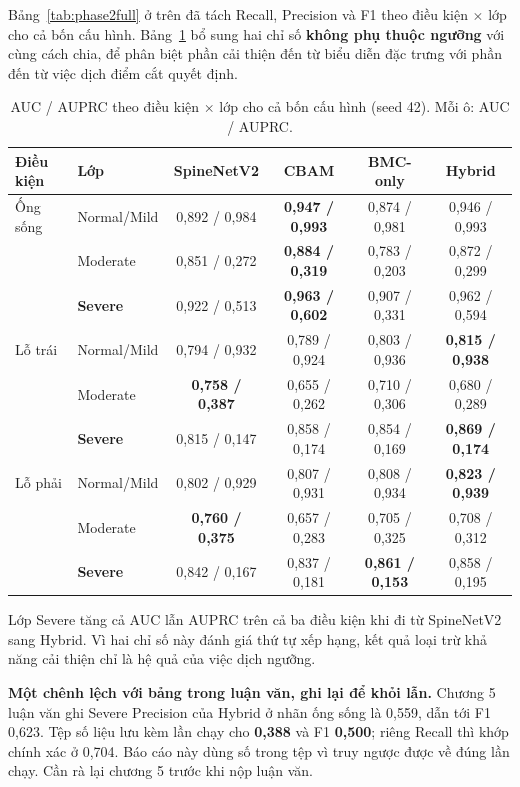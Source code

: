 \documentclass[11pt,a4paper]{article}
\begin{document}
Bảng~\ref{tab:phase2full} ở trên đã tách Recall, Precision và F1 theo điều kiện $\times$ lớp cho cả
bốn cấu hình. Bảng~\ref{tab:phase2auc} bổ sung hai chỉ số \textbf{không phụ thuộc ngưỡng} với cùng
cách chia, để phân biệt phần cải thiện đến từ biểu diễn đặc trưng với phần đến từ việc dịch điểm
cắt quyết định.

\begin{table}[htbp]\centering\scriptsize
\caption{AUC / AUPRC theo điều kiện $\times$ lớp cho cả bốn cấu hình (seed 42). Mỗi ô: AUC / AUPRC.}
\label{tab:phase2auc}
\setlength{\tabcolsep}{4pt}
\begin{tabular}{llcccc}\toprule
\textbf{Điều kiện} & \textbf{Lớp} & \textbf{SpineNetV2} & \textbf{CBAM} & \textbf{BMC-only} & \textbf{Hybrid} \\\midrule
Ống sống & Normal/Mild & 0{,}892 / 0{,}984 & \textbf{0{,}947 / 0{,}993} & 0{,}874 / 0{,}981 & 0{,}946 / 0{,}993 \\
 & Moderate & 0{,}851 / 0{,}272 & \textbf{0{,}884 / 0{,}319} & 0{,}783 / 0{,}203 & 0{,}872 / 0{,}299 \\
 & \textbf{Severe} & 0{,}922 / 0{,}513 & \textbf{0{,}963 / 0{,}602} & 0{,}907 / 0{,}331 & 0{,}962 / 0{,}594 \\
\midrule
Lỗ trái & Normal/Mild & 0{,}794 / 0{,}932 & 0{,}789 / 0{,}924 & 0{,}803 / 0{,}936 & \textbf{0{,}815 / 0{,}938} \\
 & Moderate & \textbf{0{,}758 / 0{,}387} & 0{,}655 / 0{,}262 & 0{,}710 / 0{,}306 & 0{,}680 / 0{,}289 \\
 & \textbf{Severe} & 0{,}815 / 0{,}147 & 0{,}858 / 0{,}174 & 0{,}854 / 0{,}169 & \textbf{0{,}869 / 0{,}174} \\
\midrule
Lỗ phải & Normal/Mild & 0{,}802 / 0{,}929 & 0{,}807 / 0{,}931 & 0{,}808 / 0{,}934 & \textbf{0{,}823 / 0{,}939} \\
 & Moderate & \textbf{0{,}760 / 0{,}375} & 0{,}657 / 0{,}283 & 0{,}705 / 0{,}325 & 0{,}708 / 0{,}312 \\
 & \textbf{Severe} & 0{,}842 / 0{,}167 & 0{,}837 / 0{,}181 & \textbf{0{,}861 / 0{,}153} & 0{,}858 / 0{,}195 \\
\bottomrule\end{tabular}\end{table}

Lớp Severe tăng cả AUC lẫn AUPRC trên cả ba điều kiện khi đi từ SpineNetV2 sang Hybrid. Vì hai chỉ
số này đánh giá thứ tự xếp hạng, kết quả loại trừ khả năng cải thiện chỉ là hệ quả của việc dịch
ngưỡng.

\textbf{Một chênh lệch với bảng trong luận văn, ghi lại để khỏi lẫn.} Chương 5 luận văn ghi Severe
Precision của Hybrid ở nhãn ống sống là 0{,}559, dẫn tới F1 0{,}623. Tệp số liệu lưu kèm lần chạy
cho \textbf{0{,}388} và F1 \textbf{0{,}500}; riêng Recall thì khớp chính xác ở 0{,}704. Báo cáo này
dùng số trong tệp vì truy ngược được về đúng lần chạy. Cần rà lại chương 5 trước khi nộp luận văn.
\end{document}
